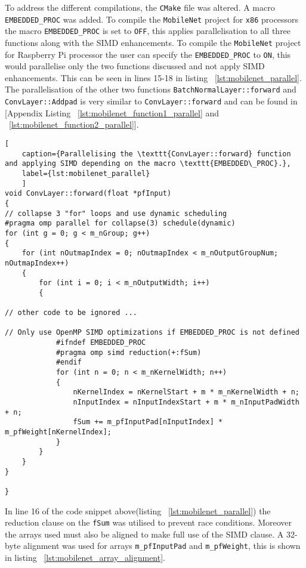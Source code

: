 To address the different compilations, the \texttt{CMake} file was altered. A macro \texttt{EMBEDDED\_PROC} was added. To compile the \texttt{MobileNet} project for \texttt{x86} processors the macro \texttt{EMBEDDED\_PROC} is set to \texttt{OFF}, this applies parallelisation to all three functions along with the SIMD enhancements. To compile the \texttt{MobileNet} project for Raspberry Pi processor the user can specify the \texttt{EMBEDDED\_PROC} to \texttt{ON}, this would parallelise only the two functions discussed and not apply SIMD enhancements. This can be seen in lines 15-18 in listing ~\ref{lst:mobilenet_parallel}. The parallelisation of the other two functions \texttt{BatchNormalLayer::forward} and \texttt{ConvLayer::Addpad} is very similar to \texttt{ConvLayer::forward} and can be found in [Appendix Listing ~\ref{lst:mobilenet_function1_parallel} and ~\ref{lst:mobilenet_function2_parallel}]. 

\begin{lstlisting}[
	caption={Parallelising the \texttt{ConvLayer::forward} function and applying SIMD depending on the macro \texttt{EMBEDDED\_PROC}.},
	label={lst:mobilenet_parallel}
	]
void ConvLayer::forward(float *pfInput)
{
// collapse 3 "for" loops and use dynamic scheduling 
#pragma omp parallel for collapse(3) schedule(dynamic)
for (int g = 0; g < m_nGroup; g++)
{
	for (int nOutmapIndex = 0; nOutmapIndex < m_nOutputGroupNum; nOutmapIndex++)
	{
		for (int i = 0; i < m_nOutputWidth; i++)
		{
			
// other code to be ignored ... 
			
// Only use OpenMP SIMD optimizations if EMBEDDED_PROC is not defined 
			#ifndef EMBEDDED_PROC
			#pragma omp simd reduction(+:fSum)
			#endif
			for (int n = 0; n < m_nKernelWidth; n++)
			{
				nKernelIndex = nKernelStart + m * m_nKernelWidth + n;
				nInputIndex = nInputIndexStart + m * m_nInputPadWidth + n;
				fSum += m_pfInputPad[nInputIndex] * m_pfWeight[nKernelIndex];
			}
		}
	}              
}

}
\end{lstlisting}

In line 16 of the code snippet above(listing ~\ref{lst:mobilenet_parallel}) the reduction clause on the \texttt{fSum} was utilised to prevent race conditions. Moreover the arrays used must also be aligned to make full use of the SIMD clause. A 32-byte alignment was used for arrays \texttt{m\_pfInputPad} and  \texttt{m\_pfWeight}, this is shown in listing  ~\ref{lst:mobilenet_array_alignment}.


